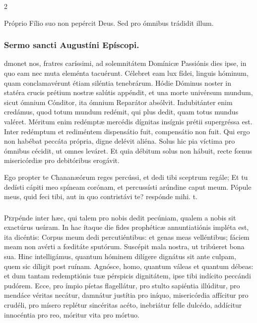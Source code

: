 \documentclass[9pt,twoside]{extarticle}
\begin{document}
\begin{multicols}{2}
\begin{tightlist}{}
\item {} Próprio Fílio suo non pepércit Deus.  Sed pro ómnibus trádidit illum.
\end{tightlist}

\subsubsection*{\center Sermo sancti Augustíni Epíscopi.}
\begin{center}\end{center}
dmonet nos, fratres caríssimi, ad solemnitátem Domínicæ Passiónis dies ipse, in quo eam nec muta eleménta tacuérunt. Célebret eam lux fídei, linguis hóminum, quam conclamavérunt étiam siléntia tenebrárum. Hódie Dóminus noster in statéra crucis prétium nostræ salútis appéndit, et una morte univérsum mundum, sicut ómnium Cónditor, ita ómnium Reparátor absólvit. Indubitánter enim credámus, quod totum mundum redémit, qui plus dedit, quam totus mundus valéret. Méritum enim redémptæ mercédis dígnitas insígnis prétii supergréssa est. Inter redémptum et rediméntem dispensátio fuit, compensátio non fuit. Qui ergo non habébat peccáta própria, digne delévit aliéna. Solus hic pia víctima pro ómnibus cécidit, ut omnes leváret. Et quia débitum solus non hábuit, recte fœnus misericórdiæ pro debitóribus erogávit.

\begin{tightlist}{}
\item {} Ego propter te Chananæórum reges percússi, et dedi tibi sceptrum regále; \textred{*} Et tu dedísti cápiti meo spíneam corónam, et percussísti arúndine caput meum.  Pópule meus, quid feci tibi, aut in quo contristávi te? respónde mihi. t.
\end{tightlist}

\subsubsection*{\center{}}
\lettrine{P}erpénde inter hæc, qui talem pro nobis dedit pecúniam, qualem a nobis sit exactúrus usúram. In hac ítaque die fides prophéticæ annuntiatiónis impléta est, ita dicéntis: Corpus meum dedi percutiéntibus: et genas meas velléntibus; fáciem meam non avérti a fœditáte sputórum. Suscépit mala nostra, ut tribúeret bona sua. Hinc intelligámus, quantum hóminem dilígere dignátus sit ante culpam, quem sic díligit post ruínam. Agnósce, homo, quantum váleas et quantum débeas: et dum tantam redemptiónis tuæ pérspicis dignitátem, ipse tibi indícito peccándi pudórem. Ecce, pro ímpio píetas flagellátur, pro stulto sapiéntia illúditur, pro mendáce véritas necátur, damnátur justítia pro iníquo, misericórdia affícitur pro crudéli, pro mísero replétur sincéritas acéto, inebriátur felle dulcédo, addícitur innocéntia pro reo, móritur vita pro mórtuo.


\end{multicols}
\end{document}

